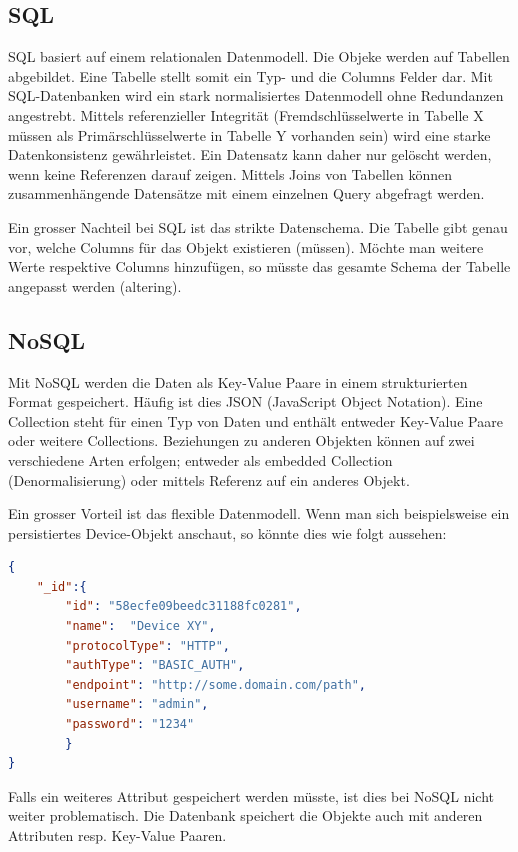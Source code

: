 \subsection{SQL}
SQL basiert auf einem relationalen Datenmodell. Die Objeke werden auf Tabellen abgebildet. Eine Tabelle stellt somit ein Typ- und die Columns Felder dar. Mit SQL-Datenbanken wird ein stark normalisiertes Datenmodell ohne Redundanzen angestrebt. Mittels referenzieller Integrität (Fremdschlüsselwerte in Tabelle X müssen als Primärschlüsselwerte in Tabelle Y vorhanden sein) wird eine starke Datenkonsistenz gewährleistet. Ein Datensatz kann daher nur gelöscht werden, wenn keine Referenzen darauf zeigen. Mittels Joins von Tabellen können zusammenhängende Datensätze mit einem einzelnen Query abgefragt werden.

Ein grosser Nachteil bei SQL ist das strikte Datenschema. Die Tabelle gibt genau vor, welche Columns für das Objekt existieren (müssen). Möchte man weitere Werte respektive Columns hinzufügen, so müsste das gesamte Schema der Tabelle angepasst werden (altering).

\subsection{NoSQL}
Mit NoSQL werden die Daten als Key-Value Paare in einem strukturierten Format gespeichert. Häufig ist dies JSON (JavaScript Object Notation). Eine Collection steht für einen Typ von Daten und enthält entweder Key-Value Paare oder weitere Collections. Beziehungen zu anderen Objekten können auf zwei verschiedene Arten erfolgen; entweder als embedded Collection (Denormalisierung) oder mittels Referenz auf ein anderes Objekt.

Ein grosser Vorteil ist das flexible Datenmodell. Wenn man sich beispielsweise ein persistiertes Device-Objekt anschaut, so könnte dies wie folgt aussehen:
\begin{lstlisting}[language=json]
{
    "_id":{
        "id": "58ecfe09beedc31188fc0281",
        "name":  "Device XY",
        "protocolType": "HTTP",
        "authType": "BASIC_AUTH",
        "endpoint": "http://some.domain.com/path",
        "username": "admin",
        "password": "1234"
        }    
}
\end{lstlisting}
Falls ein weiteres Attribut gespeichert werden müsste, ist dies bei NoSQL nicht weiter problematisch. Die Datenbank speichert die Objekte auch mit anderen Attributen resp. Key-Value Paaren.

